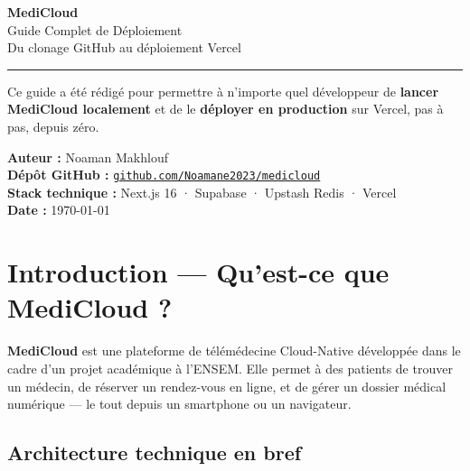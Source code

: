 \documentclass[12pt, a4paper]{article}
\begin{document}
\begin{titlepage}
  \centering
  \vspace*{2cm}

  {\huge\bfseries\color{teal} MediCloud}\\[0.5cm]
  {\Large\color{indigo} Guide Complet de Déploiement}\\[0.3cm]
  {\large\color{gray} Du clonage GitHub au déploiement Vercel}

  \vspace{1.5cm}
  \rule{0.6\textwidth}{1.5pt}
  \vspace{1cm}

  \begin{tcolorbox}[colback=teal!10, colframe=teal, width=0.8\textwidth]
    \centering
    Ce guide a été rédigé pour permettre à n'importe quel développeur de
    \textbf{lancer MediCloud localement} et de le \textbf{déployer en production}
    sur Vercel, pas à pas, depuis zéro.
  \end{tcolorbox}

  \vspace{1.5cm}
  {\textbf{Auteur :} Noaman Makhlouf}\\[0.3cm]
  {\textbf{Dépôt GitHub :} \href{https://github.com/Noamane2023/medicloud}{\texttt{github.com/Noamane2023/medicloud}}}\\[0.3cm]
  {\textbf{Stack technique :} Next.js 16 · Supabase · Upstash Redis · Vercel}\\[0.3cm]
  {\textbf{Date :} \today}
\end{titlepage}

\tableofcontents
\newpage

\section{Introduction — Qu'est-ce que MediCloud ?}

\textbf{MediCloud} est une plateforme de télémédecine Cloud-Native développée
dans le cadre d'un projet académique à l'ENSEM. Elle permet à des patients
de trouver un médecin, de réserver un rendez-vous en ligne, et de gérer
un dossier médical numérique — le tout depuis un smartphone ou un navigateur.

\subsection*{Architecture technique en bref}
\end{document}
